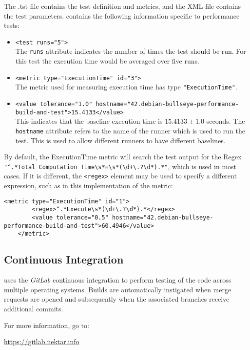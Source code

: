 The .tst file contains the test definition and metrics, and the XML file contains the test parameters.  contains the following information specific to performance tests:
\begin{itemize}
    \item \lstinline{<test runs="5">} \\
    The \lstinline{runs} attribute indicates the number of times the test should be run. For this test the execution time would be averaged over five runs.\\

    \item \lstinline{<metric type="ExecutionTime" id="3">} \\
    The metric used for measuring execution time has type \lstinline{"ExecutionTime"}.\\

    \item \lstinline{<value tolerance="1.0" hostname="42.debian-bullseye-performance-build-and-test">15.4133</value>} \\
    This indicates that the baseline execution time is $15.4133 \pm 1.0$ seconds. The \lstinline{hostname} attribute refers to the name of the runner which is used to run the test. This is used to allow different runners to have different baselines.\\
\end{itemize}

By default, the ExecutionTime metric will search the test output for the Regex \lstinline{"^.*Total Computation Time\s*=\s*(\d+\.?\d*).*"}, which is used in most cases. If it is different, the \lstinline{<regex>} element may be used to specify a different expression, such as in this implementation of the metric:

\begin{lstlisting}[firstnumber=16]
    <metric type="ExecutionTime" id="1">
        <regex>^.*Execute\s*(\d+\.?\d*).*</regex>
        <value tolerance="0.5" hostname="42.debian-bullseye-performance-build-and-test">60.4946</value>
    </metric>
\end{lstlisting}

\subsection{Continuous Integration}
{\nek} uses the \emph{GitLab} continuous integration to perform testing of the code across multiple operating systems.  Builds are automatically instigated when merge requests are opened and subsequently when the associated branches receive additional commits.

For more information, go to:

\url{https://gitlab.nektar.info}


%


